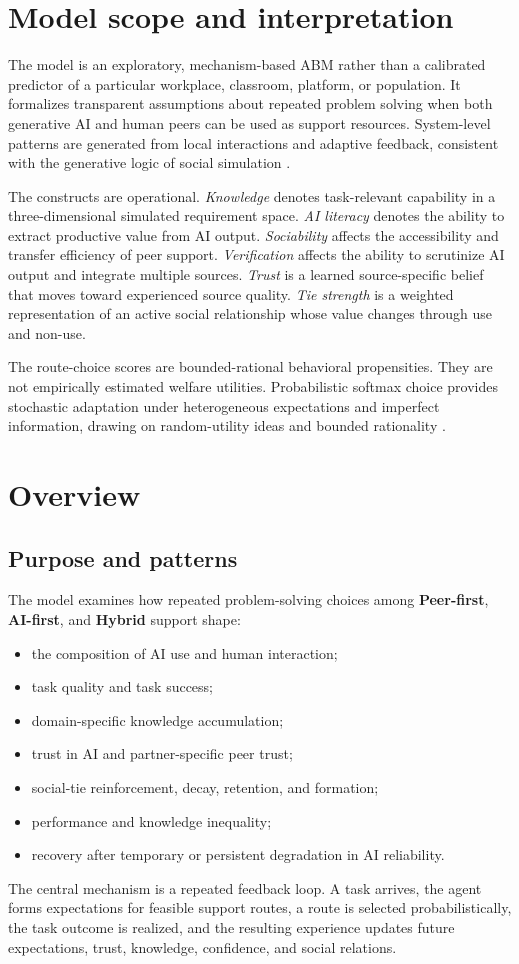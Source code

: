 \documentclass[11pt]{article}
\begin{document}
\section{Model scope and interpretation}
The model is an exploratory, mechanism-based ABM rather than a calibrated predictor of a particular workplace, classroom, platform, or population. It formalizes transparent assumptions about repeated problem solving when both generative AI and human peers can be used as support resources. System-level patterns are generated from local interactions and adaptive feedback, consistent with the generative logic of social simulation \cite{epstein2006generative}.

The constructs are operational. \emph{Knowledge} denotes task-relevant capability in a three-dimensional simulated requirement space. \emph{AI literacy} denotes the ability to extract productive value from AI output. \emph{Sociability} affects the accessibility and transfer efficiency of peer support. \emph{Verification} affects the ability to scrutinize AI output and integrate multiple sources. \emph{Trust} is a learned source-specific belief that moves toward experienced source quality. \emph{Tie strength} is a weighted representation of an active social relationship whose value changes through use and non-use.

The route-choice scores are bounded-rational behavioral propensities. They are not empirically estimated welfare utilities. Probabilistic softmax choice provides stochastic adaptation under heterogeneous expectations and imperfect information, drawing on random-utility ideas \cite{mcfadden1974conditional} and bounded rationality \cite{simon1955behavioral}.

\section{Overview}
\subsection{Purpose and patterns}
The model examines how repeated problem-solving choices among \textbf{Peer-first}, \textbf{AI-first}, and \textbf{Hybrid} support shape:
\begin{itemize}
\item the composition of AI use and human interaction;
\item task quality and task success;
\item domain-specific knowledge accumulation;
\item trust in AI and partner-specific peer trust;
\item social-tie reinforcement, decay, retention, and formation;
\item performance and knowledge inequality;
\item recovery after temporary or persistent degradation in AI reliability.
\end{itemize}
The central mechanism is a repeated feedback loop. A task arrives, the agent forms expectations for feasible support routes, a route is selected probabilistically, the task outcome is realized, and the resulting experience updates future expectations, trust, knowledge, confidence, and social relations.
\end{document}
